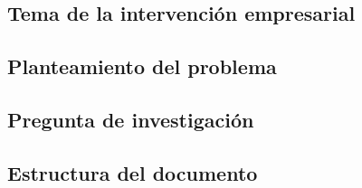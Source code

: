 \subsection*{Tema de la intervenci\'on empresarial}
\subsection*{Planteamiento del problema}
\subsection*{Pregunta de investigaci\'on}
\subsection*{Estructura del documento}